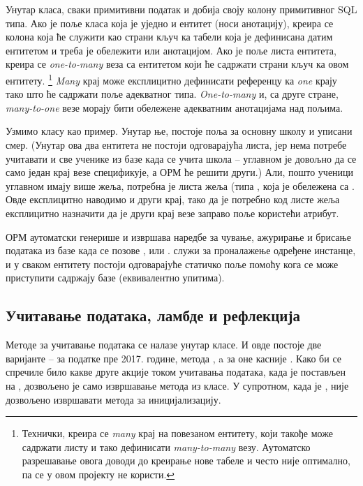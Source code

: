 Унутар класа, сваки примитивни податак и  добија своју колону примитивног SQL типа. Ако је поље класа која је уједно и ентитет (носи  анотацију), креира се колона која ће служити као страни кључ ка табели која је дефинисана датим ентитетом и треба је обележити  или  анотацијом. Ако је поље листа ентитета, креира се \emph{one-to-many} веза са ентитетом који ће садржати страни кључ ка овом ентитету. \footnote{Технички, креира се \textit{many} крај на повезаном ентитету, који такође може садржати листу и тако дефинисати \emph{many-to-many} везу. Аутоматско разрешавање овога доводи до креирање нове табеле и често није оптимално, па се у овом пројекту не користи.} \textit{Many} крај може експлицитно дефинисати референцу ка \textit{one} крају тако што ће садржати поље адекватног типа. \textit{One-to-many} и, са друге стране, \emph{many-to-one} везе морају бити обележене адекватним анотацијама над пољима.

Узмимо класу  као пример. Унутар ње, постоје  поља за основну школу и уписани смер. (Унутар ова два ентитета не постоји одговарајућа листа, јер нема потребе учитавати и све ученике из базе када се учита школа -- углавном је довољно да се само један крај везе спецификује, а ОРМ ће решити други.) Али, пошто ученици углавном имају више жеља, потребна је листа жеља (типа , која је обележена са . Овде експлицитно наводимо и други крај, тако да је потребно код листе жеља експлицитно назначити да је други крај везе заправо поље  користећи  атрибут.

ОРМ аутоматски генерише и извршава наредбе за чување, ажурирање и брисање података из базе када се позове ,  или .  служи за проналажење одређене инстанце, и у сваком ентитету постоји одговарајуће статичко поље  помоћу кога се може приступити садржају базе (еквивалентно  упитима).

\subsection{Учитавање података, ламбде и рефлекција}\label{subs:refl}

Методе за учитавање података се налазе унутар  класе. И овде постоје две варијанте -- за податке пре 2017. године, метода , a за оне касније . Како би се спречиле било какве друге акције током учитавања података, када је  постављен на , дозвољено је само извршавање метода из  класе. У супротном, када је   , није дозвољено извршавати метода за иницијализацију.


